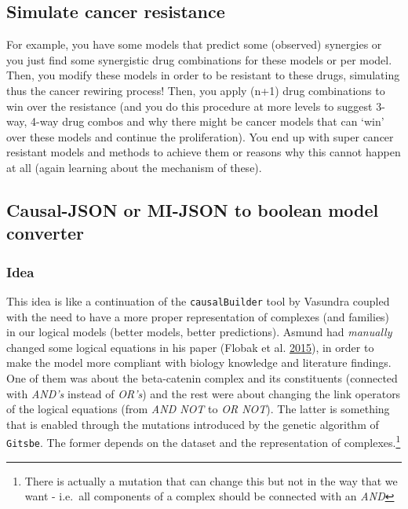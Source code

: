 \documentclass[
  12pt,
]{book}
\begin{document}
\hypertarget{simulate-cancer-resistance}{%
\subsection*{Simulate cancer resistance}\label{simulate-cancer-resistance}}

For example, you have some models that predict some (observed) synergies or you just find some synergistic drug combinations for these models or per model.
Then, you modify these models in order to be resistant to these drugs, simulating thus the cancer rewiring process!
Then, you apply (n+1) drug combinations to win over the resistance (and you do this procedure at more levels to suggest
3-way, 4-way drug combos and why there might be cancer models that can `win' over these models and continue the proliferation).
You end up with super cancer resistant models and methods to achieve them or reasons why this cannot happen at all (again learning about the mechanism of these).

\hypertarget{causal-json-or-mi-json-to-boolean-model-converter}{%
\subsection*{Causal-JSON or MI-JSON to boolean model converter}\label{causal-json-or-mi-json-to-boolean-model-converter}}

\hypertarget{idea}{%
\subsubsection*{Idea}\label{idea}}

This idea is like a continuation of the \texttt{causalBuilder} tool by Vasundra coupled with the need to have a more proper representation of complexes (and families) in our logical models (better models, better predictions).
Asmund had \emph{manually} changed some logical equations in his paper (Flobak et al. \protect\hyperlink{ref-Flobak2015}{2015}), in order to make the model more compliant with biology knowledge and literature findings.
One of them was about the beta-catenin complex and its constituents (connected with \emph{AND's} instead of \emph{OR's}) and the rest were about changing the link operators of the logical equations (from \emph{AND NOT} to \emph{OR NOT}).
The latter is something that is enabled through the mutations introduced by the genetic algorithm of \texttt{Gitsbe}.
The former depends on the dataset and the representation of complexes.\footnote{There is actually a mutation that can change this but not in the way that we want - i.e.~all components of a complex should be connected with an \emph{AND}}
\end{document}
